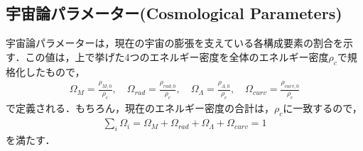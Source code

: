 \subsection{宇宙論パラメーター(Cosmological  Parameters)}
宇宙論パラメーターは，現在の宇宙の膨張を支えている各構成要素の割合を示す．この値は，上で挙げた4つのエネルギー密度を全体のエネルギー密度$\rho_{c}$で規格化したもので，
\begin{eqnarray}
\Omega_{M}=\frac{\rho_{M,0}}{\rho_c},\quad \Omega_{rad}=\frac{\rho_{rad,0}}{\rho_c},\quad \Omega_{\Lambda}=\frac{\rho_{\Lambda,0}}{\rho_c},\quad \Omega_{curv}=\frac{\rho_{curv,0}}{\rho_c}
\end{eqnarray}
で定義される．もちろん，現在のエネルギー密度の合計は，$\rho_{c}$に一致するので，
\begin{eqnarray}
\sum_{i}\Omega_i=\Omega_M+\Omega_{rad}+\Omega_{\Lambda}+\Omega_{curv}=1
\end{eqnarray}
を満たす．


